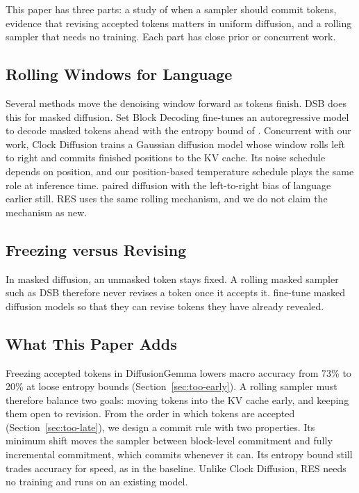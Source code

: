 This paper has three parts: a study of when a sampler should commit tokens, evidence that revising accepted tokens matters in uniform diffusion, and a rolling sampler that needs no training. Each part has close prior or concurrent work.

\subsection{Rolling Windows for Language}
Several methods move the denoising window forward as tokens finish.
DSB \citep{luo2026dsb} does this for masked diffusion.
Set Block Decoding \citep{gat2025set} fine-tunes an autoregressive model to decode masked tokens ahead with the entropy bound of \citet{ben2026accelerated}.
Concurrent with our work, Clock Diffusion \citep{schiff2026clock} trains a Gaussian diffusion model whose window rolls left to right and commits finished positions to the KV cache.
Its noise schedule depends on position, and our position-based temperature schedule plays the same role at inference time.
\citet{wu2023ar} paired diffusion with the left-to-right bias of language earlier still.
RES uses the same rolling mechanism, and we do not claim the mechanism as new.

\subsection{Freezing versus Revising}
In masked diffusion, an unmasked token stays fixed.
A rolling masked sampler such as DSB therefore never revises a token once it accepts it.
\citet{kim2025fine} fine-tune masked diffusion models so that they can revise tokens they have already revealed.

\subsection{What This Paper Adds}
Freezing accepted tokens in DiffusionGemma lowers macro accuracy from 73\% to 20\% at loose entropy bounds (Section~\ref{sec:too-early}).
A rolling sampler must therefore balance two goals: moving tokens into the KV cache early, and keeping them open to revision.
From the order in which tokens are accepted (Section~\ref{sec:too-late}), we design a commit rule with two properties.
Its minimum shift moves the sampler between block-level commitment and fully incremental commitment, which commits whenever it can.
Its entropy bound still trades accuracy for speed, as in the baseline.
Unlike Clock Diffusion, RES needs no training and runs on an existing model.

